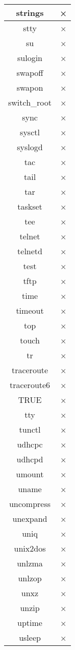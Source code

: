 \begin{longtable}{cc}
strings & × \\ \hline
stty & × \\ \hline
su & × \\ \hline
sulogin & × \\ \hline
swapoff & × \\ \hline
swapon & × \\ \hline
switch\_root & × \\ \hline
sync & × \\ \hline
sysctl & × \\ \hline
syslogd & × \\ \hline
tac & × \\ \hline
tail & × \\ \hline
tar & × \\ \hline
taskset & × \\ \hline
tee & × \\ \hline
telnet & × \\ \hline
telnetd & × \\ \hline
test & × \\ \hline
tftp & × \\ \hline
time & × \\ \hline
timeout & × \\ \hline
top & × \\ \hline
touch & × \\ \hline
tr & × \\ \hline
traceroute & × \\ \hline
traceroute6 & × \\ \hline
TRUE & × \\ \hline
tty & × \\ \hline
tunctl & × \\ \hline
udhcpc & × \\ \hline
udhcpd & × \\ \hline
umount & × \\ \hline
uname & × \\ \hline
uncompress & × \\ \hline
unexpand & × \\ \hline
uniq & × \\ \hline
unix2dos & × \\ \hline
unlzma & × \\ \hline
unlzop & × \\ \hline
unxz & × \\ \hline
unzip & × \\ \hline
uptime & × \\ \hline
usleep & × \\ \hline

\end{longtable}
